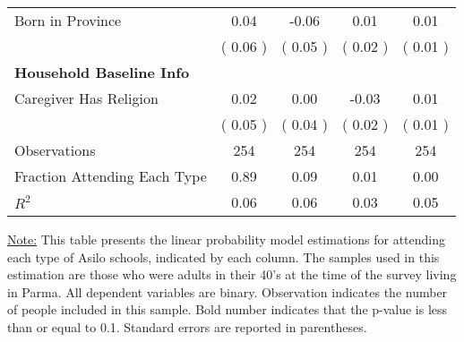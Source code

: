 \begin{table}[H]
{\begin{tabular}{lcccc}
\quad Born in Province &      0.04 &     -0.06 &      0.01 &      0.01 \\
\quad  & (     0.06 ) & (     0.05 )  & (     0.02 )  & (     0.01 )  \\
\midrule
\textbf{Household Baseline Info} \\
\quad Caregiver Has Religion &      0.02 &      0.00 &     -0.03 &      0.01 \\
\quad  & (     0.05 ) & (     0.04 )  & (     0.02 )  & (     0.01 )  \\
\midrule
Observations & 254 & 254 & 254 & 254 \\
Fraction Attending Each Type &      0.89 &      0.09 &      0.01 &      0.00 \\
\midrule
$ R^2$ &      0.06 &      0.06 &      0.03 &      0.05 \\
\bottomrule
\end{tabular}}
\end{table}
\begin{scriptsize}
\noindent\underline{Note:} This table presents the linear probability model estimations for attending each type of Asilo schools, indicated by each column. The samples used in this estimation are those who were adults in their 40's at the time of the survey living in Parma. All dependent variables are binary. Observation indicates the number of people included in this sample. Bold number indicates that the p-value is less than or equal to 0.1. Standard errors are reported in parentheses.
\end{scriptsize}
